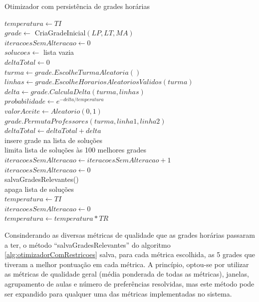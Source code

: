 \begin{algorithm}
	\caption{Otimizador com persistência de grades horárias}
	\label{alg:otimizadorComRestricoes}
	$temperatura \leftarrow TI$\\
	$grade \leftarrow$ CriaGradeInicial$(LP, LT, MA)$\\
	$iteracoesSemAlteracao \leftarrow 0$\\
	$solucoes \leftarrow$ lista vazia\\
	 {
		$deltaTotal \leftarrow 0$\\
		 {
			$turma \leftarrow grade.EscolheTurmaAleatoria()$\\
			$linhas \leftarrow grade.EscolheHorariosAleatoriosValidos(turma)$\\
			$delta \leftarrow grade.CalculaDelta(turma, linhas)$\\
			$probabilidade \leftarrow e^{-delta/temperatura}$\\
			$valorAceite \leftarrow Aleatorio(0, 1)$\\
			 {
				$grade.PermutaProfessores(turma, linha1, linha2)$\\
				$deltaTotal \leftarrow deltaTotal + delta$\\
				 {
					insere grade na lista de soluções\\
					limita lista de soluções às 100 melhores grades\\
				}
			}
		}
		 {
			$iteracoesSemAlteracao \leftarrow iteracoesSemAlteracao + 1$\\
		}{
			$iteracoesSemAlteracao \leftarrow 0$\\
		}
		 {
			salvaGradesRelevantes()\\
			apaga lista de soluções\\
			$temperatura \leftarrow TI$\\
			$iteracoesSemAlteracao \leftarrow 0$\\
		}
		$temperatura \leftarrow temperatura * TR$
	}
\end{algorithm}
\pagebreak

Consinderando as diversas métricas de qualidade que as grades horárias passaram a ter, o método ``salvaGradesRelevantes'' do algoritmo \ref{alg:otimizadorComRestricoes} salva, para cada métrica escolhida, as 5 grades que tiveram a melhor pontuação em cada métrica. A princípio, optou-se por utilizar as métricas de qualidade geral (média ponderada de todas as métricas), janelas, agrupamento de aulas e número de preferências resolvidas, mas este método pode ser expandido para qualquer uma das métricas implementadas no sistema.

